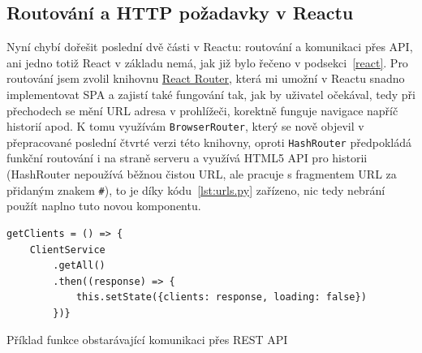     \subsection{Routování a HTTP požadavky v Reactu}\label{subsec:reactPozadavky}
    Nyní chybí dořešit poslední dvě části v Reactu: routování a komunikaci přes API, ani jedno totiž React v základu nemá, jak již bylo řečeno v podsekci~\ref{react}. Pro routování jsem zvolil knihovnu \href{https://reacttraining.com/}{React Router}, která mi umožní v Reactu snadno implementovat SPA a zajistí také fungování tak, jak by uživatel očekával, tedy při přechodech se mění URL adresa v prohlížeči, korektně funguje navigace napříč historií apod. K tomu využívám \verb|BrowserRouter|, který se nově objevil v přepracované poslední čtvrté verzi této knihovny, oproti \verb|HashRouter| předpokládá funkční routování i na straně serveru a využívá HTML5 API pro historii (HashRouter nepoužívá běžnou čistou URL, ale pracuje s fragmentem URL za přidaným znakem \verb|#|), to je díky kódu~\ref{lst:urls.py} zařízeno, nic tedy nebrání použít naplno tuto novou komponentu.
    
    \begin{listing}[ht]
    	\begin{verbatim}
getClients = () => {
    ClientService
        .getAll()
        .then((response) => {
            this.setState({clients: response, loading: false})
        })}
    	\end{verbatim}
    	\caption{Příklad funkce obstarávající komunikaci přes REST API}\label{lst:react3}
    \end{listing}
    
